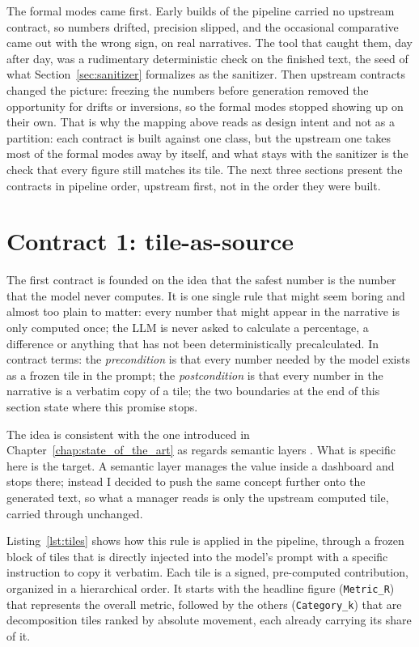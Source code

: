 \documentclass[12pt,a4paper,openright,twoside]{book}
\begin{document}
The formal modes came first.
Early builds of the pipeline carried no upstream contract, so numbers drifted, precision slipped, and the occasional comparative came out with the wrong sign, on real narratives.
The tool that caught them, day after day, was a rudimentary deterministic check on the finished text, the seed of what Section~\ref{sec:sanitizer} formalizes as the sanitizer.
Then upstream contracts changed the picture: freezing the numbers before generation removed the opportunity for drifts or inversions, so the formal modes stopped showing up on their own.
That is why the mapping above reads as design intent and not as a partition: each contract is built against one class, but the upstream one takes most of the formal modes away by itself, and what stays with the sanitizer is the check that every figure still matches its tile.
The next three sections present the contracts in pipeline order, upstream first, not in the order they were built.

\section{Contract 1: tile-as-source}
\label{sec:tileasource}

The first contract is founded on the idea that the safest number is the number that the model never computes.
It is one single rule that might seem boring and almost too plain to matter: every number that might appear in the narrative is only computed once; the \ac{LLM} is never asked to calculate a percentage, a difference or anything that has not been deterministically precalculated.
In contract terms: the \emph{precondition} is that every number needed by the model exists as a frozen tile in the prompt; the \emph{postcondition} is that every number in the narrative is a verbatim copy of a tile; the two boundaries at the end of this section state where this promise stops.

The idea is consistent with the one introduced in Chapter~\ref{chap:state_of_the_art} as regards semantic layers \cite{dbt2024semantic}.
What is specific here is the target. 
A semantic layer manages the value inside a dashboard and stops there; instead I decided to push the same concept further onto the generated text, so what a manager reads is only the upstream computed tile, carried through unchanged.

Listing~\ref{lst:tiles} shows how this rule is applied in the pipeline, through a frozen block of tiles that is directly injected into the model's prompt with a specific instruction to copy it verbatim.
Each tile is a signed, pre-computed contribution, organized in a hierarchical order.
It starts with the headline figure (\texttt{Metric\_R}) that represents the overall metric, followed by the others (\texttt{Category\_k}) that are decomposition tiles ranked by absolute movement, each already carrying its share of it.
\end{document}
